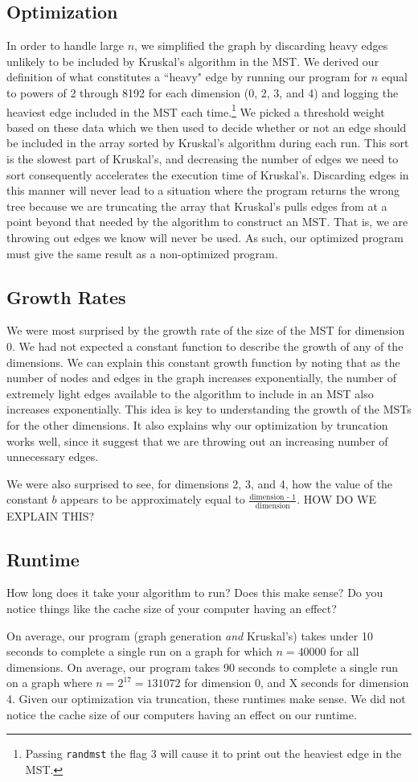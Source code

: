 \documentclass[solution, letterpaper]{cs121}
\begin{document}
\subsection*{Optimization}
In order to handle large $n$, we simplified the graph by discarding heavy edges unlikely to be included by Kruskal's algorithm in the MST. We derived our definition of what constitutes a 	``heavy" edge by running our program for $n$ equal to powers of 2 through 8192 for each dimension (0, 2, 3, and 4) and logging the heaviest edge included in the MST each time.\footnote{Passing {\tt randmst} the flag 3 will cause it to print out the heaviest edge in the MST.} We picked a threshold weight based on these data which we then used to decide whether or not an edge should be included in the array sorted by Kruskal's algorithm during each run. This sort is the slowest part of Kruskal's, and decreasing the number of edges we need to sort consequently accelerates the execution time of Kruskal's. Discarding edges in this manner will never lead to a situation where the program returns the wrong tree because we are truncating the array that Kruskal's pulls edges from at a point beyond that needed by the algorithm to construct an MST. That is, we are throwing out edges we know will never be used. As such, our optimized program must give the same result as a non-optimized program.

\subsection*{Growth Rates}
We were most surprised by the growth rate of the size of the MST for dimension 0. We had not expected a constant function to describe the growth of any of the dimensions. We can explain this constant growth function by noting that as the number of nodes and edges in the graph increases exponentially, the number of extremely light edges available to the algorithm to include in an MST also increases exponentially. This idea is key to understanding the growth of the MSTs for the other dimensions. It also explains why our optimization by truncation works well, since it suggest that we are throwing out an increasing number of unnecessary edges.

We were also surprised to see, for dimensions 2, 3, and 4, how the value of the constant $b$ appears to be approximately equal to $\frac{\text{dimension - 1}}{\text{dimension}}$. HOW DO WE EXPLAIN THIS? 

\subsection*{Runtime}
How long does it take your algorithm to run? Does this make sense? Do you notice things like the cache size of your computer having an effect?

On average, our program (graph generation \emph{and} Kruskal's) takes under 10 seconds to complete a single run on a graph for which $n = 40000$ for all dimensions. On average, our program takes 90 seconds to complete a single run on a graph where $n = 2^{17} = 131072$ for dimension 0, and X seconds for dimension 4. Given our optimization via truncation, these runtimes make sense. We did not notice the cache size of our computers having an effect on our runtime.
\end{document}
